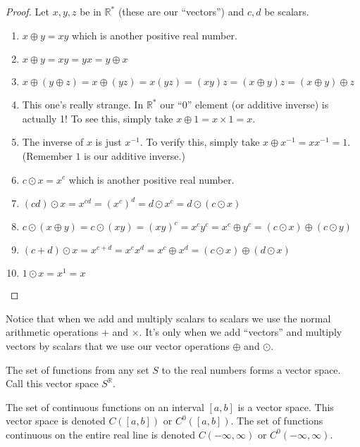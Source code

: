 \begin{proof}
	Let $x,y,z$ be in $\mathbb{R}^*$ (these are our ``vectors'') and $c,d$ be scalars.
	\begin{enumerate}[label={(\arabic*)}]
		\item $x \oplus y = xy$ which is another positive real number. 
		\item $x \oplus y = xy = yx = y \oplus x$
		\item $x \oplus (y \oplus z) = x\oplus(yz) = x(yz) = (xy)z = (x\oplus y)z = (x\oplus y)\oplus z$
		\item This one's really strange. In $\mathbb{R}^*$ our ``0'' element (or additive inverse) is actually 1! To see this, simply take $x \oplus 1 = x \times 1 = x$.
		\item The inverse of $x$ is just $x^{-1}$. To verify this, simply take $x \oplus x^{-1} = xx^{-1} = 1$. (Remember $1$ is our additive inverse.)
		\item $c \odot x = x^c$ which is another positive real number.
		\item $(cd)\odot x = x^{cd} = (x^c)^d = d\odot x^c = d\odot (c\odot x)$
		\item $c \odot (x \oplus y) = c \odot (xy) = (xy)^c = x^cy^c = x^c\oplus y^c = (c\odot x)\oplus(c\odot y)$
		\item $(c + d) \odot x = x^{c+d} = x^cx^d = x^c \oplus x^d = (c\odot x)\oplus(d\odot x)$
		\item $1 \odot x = x^1 = x$
	\end{enumerate}
\end{proof}

\begin{remark}
	Notice that when we add and multiply scalars to scalars we use the normal arithmetic operations $+$ and $\times$. It's only when we add ``vectors'' and multiply vectors by scalars that we use our vector operations $\oplus$ and $\odot$.
\end{remark}

\begin{example}
	The set of functions from any set $S$ to the real numbers forms a vector space. Call this vector space $S^\mathbb{R}$.
\end{example}

\begin{example}
	The set of continuous functions on an interval $[a,b]$ is a vector space. This vector space is denoted $C([a,b])$ or $C^0([a,b])$. The set of functions continuous on the entire real line is denoted $C(-\infty,\infty)$ or $C^0(-\infty,\infty)$.
\end{example}

